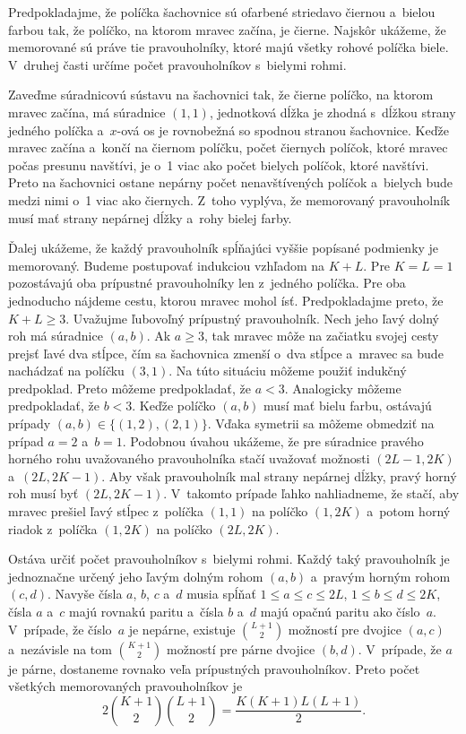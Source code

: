 {%
Predpokladajme, že políčka šachovnice sú ofarbené striedavo čiernou a~bielou farbou tak, že políčko, na ktorom mravec začína, je čierne. Najskôr ukážeme, že {\smc memo}rované sú práve tie pravouholníky, ktoré majú všetky rohové políčka biele. V~druhej časti určíme počet pravouholníkov s~bielymi rohmi.

Zaveďme súradnicovú sústavu na šachovnici tak, že čierne políčko, na ktorom mravec začína, má súradnice $(1,1)$, jednotková dĺžka je zhodná s~dĺžkou strany jedného políčka a~$x$-ová os je rovnobežná so spodnou stranou šachovnice. Keďže mravec začína a~končí na čiernom políčku, počet čiernych políčok, ktoré mravec počas presunu navštívi, je o~1 viac ako počet bielych políčok, ktoré navštívi. Preto na šachovnici ostane nepárny počet nenavštívených políčok a~bielych bude medzi nimi o~1 viac ako čiernych. Z~toho vyplýva, že {\smc memo}rovaný pravouholník musí mať strany nepárnej dĺžky a~rohy bielej farby.

Ďalej ukážeme, že každý pravouholník spĺňajúci vyššie popísané podmienky je {\smc memo}rovaný. Budeme postupovať indukciou vzhľadom na $K+L$. Pre $K = L = 1$ pozostávajú oba prípustné pravouholníky len z~jedného políčka. Pre oba jednoducho nájdeme cestu, ktorou mravec mohol ísť. Predpokladajme preto, že $K+L\ge3$. Uvažujme ľubovoľný prípustný pravouholník. Nech jeho ľavý dolný roh má súradnice $(a,b)$. Ak $a\ge 3$, tak mravec môže na začiatku svojej cesty prejsť ľavé dva stĺpce, čím sa šachovnica zmenší o~dva stĺpce a~mravec sa bude nachádzať na políčku $(3,1)$. Na túto situáciu môžeme použiť indukčný predpoklad. Preto môžeme predpokladať, že $a<3$. Analogicky môžeme predpokladať, že $b<3$. Keďže políčko $(a,b)$ musí mať bielu farbu, ostávajú prípady $(a,b)\in\{(1,2),(2,1)\}$. Vďaka symetrii sa môžeme obmedziť na prípad $a = 2$ a~$b = 1$. Podobnou úvahou ukážeme, že pre súradnice pravého horného rohu uvažovaného pravouholníka stačí uvažovať možnosti $(2L-1,2K)$ a~$(2L,2K-1)$. Aby však pravouholník mal strany nepárnej dĺžky, pravý horný roh musí byť $(2L,2K-1)$. V~takomto prípade ľahko nahliadneme, že stačí, aby mravec prešiel ľavý stĺpec z~políčka $(1,1)$ na políčko $(1,2K)$ a~potom horný riadok z~políčka $(1,2K)$ na políčko $(2L,2K)$.

Ostáva určiť počet pravouholníkov s~bielymi rohmi. Každý taký pravouholník je jednoznačne určený jeho ľavým dolným rohom $(a,b)$ a~pravým horným rohom $(c,d)$. Navyše čísla $a$, $b$, $c$ a~$d$ musia spĺňať $1\le a\le c\le 2L$, $1\le b\le d\le 2K$, čísla $a$ a~$c$ majú rovnakú paritu a~čísla $b$ a~$d$ majú opačnú paritu ako číslo~$a$. V~prípade, že číslo~$a$ je nepárne, existuje $\binom{L+1}{2}$ možností pre dvojice $(a,c)$ a~nezávisle na tom $\binom{K+1}{2}$ možností pre párne dvojice $(b,d)$. V~prípade, že $a$ je párne, dostaneme rovnako veľa prípustných pravouholníkov. Preto počet všetkých {\smc memo}rovaných pravouholníkov je
$$
2\binom{K+1}{2}\binom{L+1}{2} = \frac{K(K+1)L(L+1)}{2}.
$$
}

